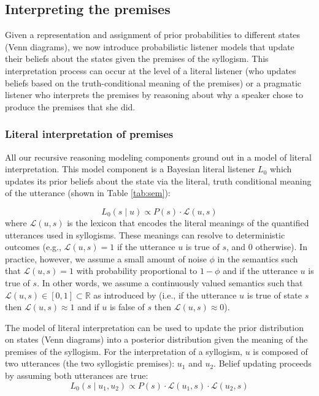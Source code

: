 \documentclass[floatsintext, doc]{apa6}
\begin{document}
\subsection{Interpreting the premises}

Given a representation and assignment of prior probabilities to different states (Venn diagrams), we now introduce probabilistic listener models that update their beliefs about the states given the premises of the syllogism. 
This interpretation process can occur at the level of a literal listener (who updates beliefs based on the truth-conditional meaning of the premises) or a pragmatic listener who interprets the premises by reasoning about why a speaker chose to produce the premises that she did. 

\subsubsection{Literal interpretation of premises}

All our recursive reasoning modeling components ground out in a model of literal interpretation.
This model component is a Bayesian literal listener $L_0$ which updates its prior beliefs about the state via the literal, truth conditional meaning of the utterance (shown in Table \ref{tab:sem}):

\begin{equation}
L_0(s \mid u ) \propto P(s)\cdot \mathcal{L}(u, s) 
\label{eq:L0}
\end{equation}
\noindent where $\mathcal{L}(u, s)$ is the lexicon that encodes the literal meanings of the quantified utterances used in syllogisms. 
These meanings can resolve to deterministic outcomes (e.g., $\mathcal{L}(u, s) = 1$ if the utterance $u$ is true of $s$, and 0 otherwise). 
In practice, however, we assume a small amount of noise $\phi$ in the semantics such that $\mathcal{L}(u, s) = 1$ with probability proportional to $1-\phi$ and if the utterance $u$ is true of $s$.
In other words, we assume a continuously valued semantics such that $\mathcal{L}(u, s) \in [0, 1] \subset \mathbb{R}$ as introduced by  (i.e., if the utterance $u$ is true of state $s$ then $\mathcal{L}(u, s) \approx 1$ and if $u$ is false of $s$ then $\mathcal{L}(u, s) \approx 0$).

The model of literal interpretation can be used to update the prior distribution on states (Venn diagrams) into a posterior distribution given the meaning of the premises of the syllogism. 
For the interpretation of a syllogism, $u$ is composed of two utterances (the two syllogistic premises): $u_1$ and $u_2$. 
Belief updating proceeds by assuming both utterances are true: 
\begin{equation}
L_0(s \mid u_1,  u_2) \propto P(s)\cdot \mathcal{L}(u_1, s) \cdot \mathcal{L}(u_2, s) 
\label{eq:L0premises}
\end{equation}
\end{document}
